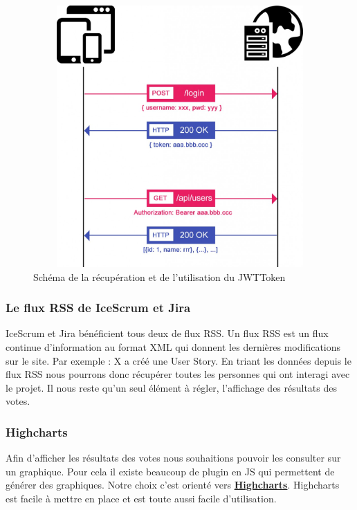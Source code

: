 \documentclass[12pt, twoside, openright]{report}
\begin{document}
\begin{figure}[h]
\centering
\includegraphics[width=15cm, height=10cm]{img/jwt-token.jpg}
\caption{Schéma de la récupération et de l'utilisation du JWTToken}
\end{figure}

\subsubsection{Le flux RSS de IceScrum et Jira}

IceScrum et Jira bénéficient tous deux de flux RSS. Un flux RSS est un flux continue d'information au format XML qui donnent les dernières modifications sur le site. Par exemple : X a créé une User Story. En triant les données depuis le flux RSS nous pourrons donc récupérer toutes les personnes qui ont interagi avec le projet. Il nous reste qu'un seul élément à régler, l'affichage des résultats des votes.  

\subsubsection{Highcharts}

Afin d'afficher les résultats des votes nous souhaitions pouvoir les consulter sur un graphique. Pour cela il existe beaucoup de plugin en JS qui permettent de générer des graphiques. Notre choix c'est orienté vers \href{https://github.com/highcharts/highcharts}{\textbf{Highcharts}}. Highcharts est facile à mettre en place et est toute aussi facile d'utilisation. 

\end{document}
